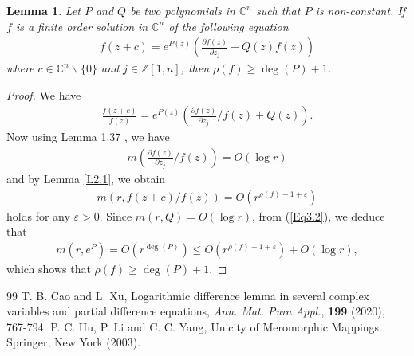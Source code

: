 \documentclass[10pt,a4paper]{amsart}
\newtheorem{lem}{Lemma}
\begin{document}
\begin{lem}\label{L2.8} Let $P$ and $Q$ be two polynomials in $\mathbb{C}^n$ such that $P$ is non-constant. If $f$ is a finite order solution in $\mathbb{C}^n$ of the following equation
\begin{align*}
f(z+c)=e^{P(z)}\left(\frac{\partial f(z)}{\partial z_j}+Q(z)f(z)\right)
\end{align*}
where $c\in\mathbb{C}^n\backslash \{0\}$ and $j\in\mathbb{Z}[1,n]$, then $\rho(f)\geq \deg(P)+1$.
\end{lem}

\begin{proof} We have
\begin{align}\label{Eq3.2}
\frac{f(z+c)}{f(z)}=e^{P(z)}\left(\frac{\partial f(z)}{\partial z_j}/f(z)+Q(z)\right).
\end{align}
Now using Lemma 1.37 \cite{Hu-Li-Yang-2003}, we have
\begin{align*}
m\left(\frac{\partial f(z)}{\partial z_j}/f(z)\right)=O(\log r)
\end{align*}
and by Lemma \ref{L2.1}, we obtain
\begin{align*}
m\left(r,f(z+c)/f(z)\right)=O\left(r^{\rho(f)-1+\varepsilon}\right)
 \end{align*}
holds for any $\varepsilon>0$. Since $m(r,Q)=O(\log r)$, from (\ref{Eq3.2}), we deduce that
\begin{align*}
m(r,e^P)=O(r^{\deg(P)})\leq O\left(r^{\rho(f)-1+\varepsilon}\right)+O(\log r),
\end{align*}
which shows that $\rho(f)\geq \deg(P)+1$.
\end{proof}

\begin{thebibliography}{99}
 {\sc T. B. Cao} and {\sc L. Xu}, Logarithmic difference lemma in several complex variables and partial difference equations, \textit{Ann. Mat. Pura Appl.}, \textbf{199} (2020), 767-794.
 {\sc P. C. Hu}, {\sc P. Li} and {\sc C. C. Yang}, Unicity of Meromorphic Mappings. Springer, New York (2003).
\end{thebibliography}
\end{document}

